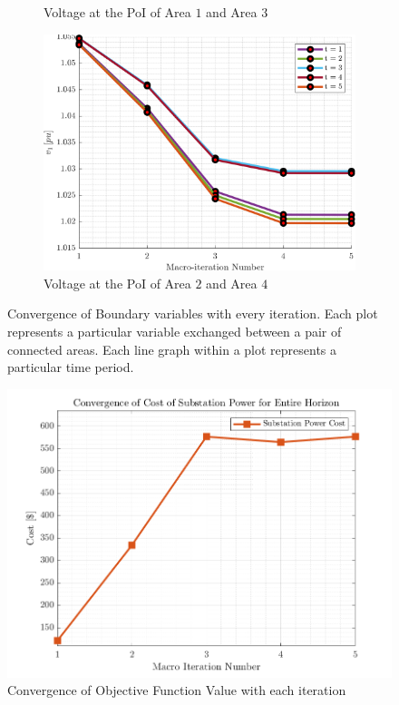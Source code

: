 \documentclass[../../outputs/main.tex]{subfiles}
\begin{document}
\begin{figure}[h!]
\begin{subfigure}[b]{0.3\textwidth}
        \caption{\scriptsize Voltage at the PoI of Area $1$ and Area $3$}
        \label{fig:voltage_1_3}
    \end{subfigure}
    \hfill
    \begin{subfigure}[b]{0.3\textwidth}
        \centering
        \includegraphics[width=\textwidth]{../figures/T5-pv20-batt30-genCost/dopf/convergenceCurves/BoundaryVoltage_vs_t_vs_macroItr_T_5_Areas_2_4_genCost_pv_20_batt_30_crop.png}
        \caption{\scriptsize Voltage at the PoI of Area $2$ and Area $4$}
        \label{fig:voltage_2_4}
    \end{subfigure}

    \caption{Convergence of Boundary variables with every iteration. Each plot represents a particular variable exchanged between a pair of connected areas. Each line graph within a plot represents a particular time period.}
    \label{fig:boundary_variables_all}
\end{figure}

\begin{figure}[h!]
    \centering
    \includegraphics[height=0.25\textheight]{../figures/T5-pv20-batt30-genCost/dopf/outputCurves/ObjectiveConvergenceCurves_Horizon_5.png}
    \caption{Convergence of Objective Function Value with each iteration}
    \label{fig:outputConvergence-5-pv20-batt30-genCost}
\end{figure}
\end{document}
